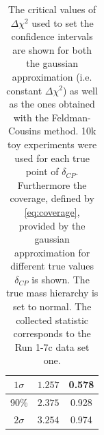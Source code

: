 \begin{table}
\begin{tabular}{| c | c | c |}
\hline
$1\sigma$				& $1.257$ 		& 0.578 	\\ \hline	
90\%					& $2.375$ 		& 0.928 	\\ \hline	
$2\sigma$				& $3.254$ 		& 0.974	\\ \hline	
\end{tabular}
\caption{
The critical values of $\Delta \chi^2$ used to set the confidence intervals are shown
for both the gaussian approximation (i.e. constant $\Delta \chi^2$) as
well as the ones obtained with the Feldman-Cousins method.
10k toy experiments were used for each true point of $\delta_{CP}$.
Furthermore the coverage, defined by \cref{eq:coverage},
provided by the gaussian approximation for different true values $\delta_{CP}$ is shown.
The true mass hierarchy is set to normal.
The collected statistic corresponds to the Run 1-7c data set one.
}             
\label{tab:critval_0_pmhalfpi_run17c}                                                                                                                                                                             
\end{table}


